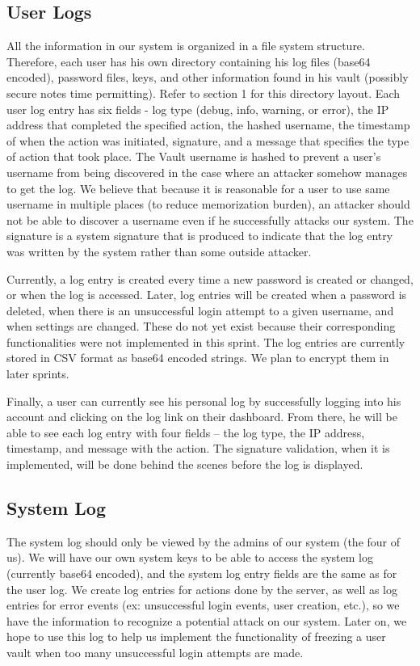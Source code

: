\documentclass{article}
\begin{document}
\subsection{User Logs}
\par All the information in our system is organized in a file system structure. Therefore, each user has his own directory containing his log files (base64 encoded), password files, keys, and other information found in his vault (possibly secure notes time permitting). Refer to section 1 for this directory layout. Each user log entry has six fields - log type (debug, info, warning, or error), the IP address that completed the specified action, the hashed username, the timestamp of when the action was initiated, signature, and a message that specifies the type of action that took place. The Vault username is hashed to prevent a user's username from being discovered in the case where an attacker somehow manages to get the log. We believe that because it is reasonable for a user to use same username in multiple places (to reduce memorization burden), an attacker should not be able to discover a username even if he successfully attacks our system. The signature is a system signature that is produced to indicate that the log entry was written by the system rather than some outside attacker.

\par Currently, a log entry is created every time a new password is created or changed, or when the log is accessed. Later, log entries will be created when a password is deleted, when there is an unsuccessful login attempt to a given username, and when settings are changed. These do not yet exist because their corresponding functionalities were not implemented in this sprint.  The log entries are currently stored in CSV format as base64 encoded strings. We plan to encrypt them in later sprints.

\par Finally, a user can currently see his personal log by successfully logging into his account and clicking on the log link on their dashboard. From there, he will be able to see each log entry with four fields – the log type, the IP address, timestamp, and message with the action. The signature validation, when it is implemented, will be done behind the scenes before the log is displayed.

\subsection{System Log}
The system log should only be viewed by the admins of our system (the four of us). We will have our own system keys to be able to access the system log (currently base64 encoded), and the system log entry fields are the same as for the user log. We create log entries for actions done by the server, as well as log entries for error events (ex: unsuccessful login events, user creation, etc.), so we have the information to recognize a potential attack on our system. Later on, we hope to use this log to help us implement the functionality of freezing a user vault when too many unsuccessful login attempts are made.
\end{document}
